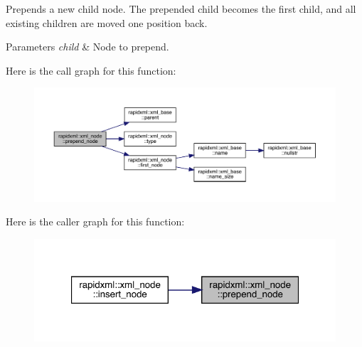 Prepends a new child node. The prepended child becomes the first child, and all existing children are moved one position back.
\begin{DoxyParams}{Parameters}
{\em child} & Node to prepend. \\
\hline
\end{DoxyParams}
Here is the call graph for this function\+:\nopagebreak
\begin{figure}[H]
\begin{center}
\leavevmode
\includegraphics[width=350pt]{classrapidxml_1_1xml__node_ae86e92908c3eab40bbed8216e4f3f3cb_cgraph}
\end{center}
\end{figure}
Here is the caller graph for this function\+:\nopagebreak
\begin{figure}[H]
\begin{center}
\leavevmode
\includegraphics[width=321pt]{classrapidxml_1_1xml__node_ae86e92908c3eab40bbed8216e4f3f3cb_icgraph}
\end{center}
\end{figure}
\mbox{\label{classrapidxml_1_1xml__node_aebcc42042ded78fb7020e2783f7d5426}} 
